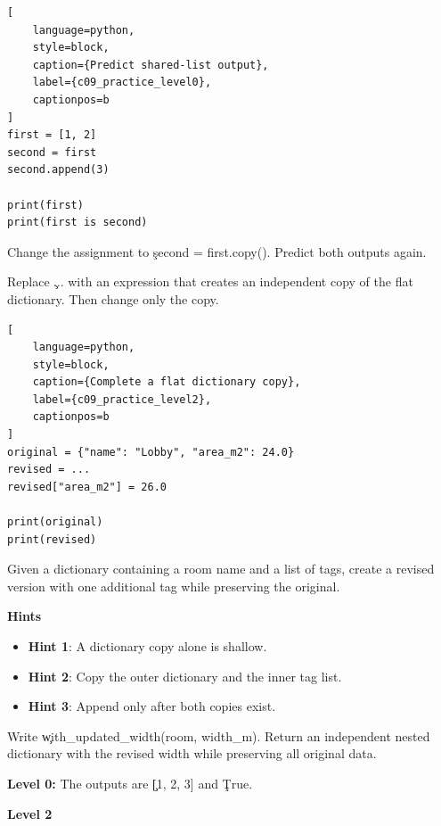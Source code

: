 

\begin{lstlisting}[
    language=python,
    style=block,
    caption={Predict shared-list output},
    label={c09_practice_level0},
    captionpos=b
]
first = [1, 2]
second = first
second.append(3)

print(first)
print(first is second)
\end{lstlisting}


Change the assignment to \c{second = first.copy()}. Predict both outputs again.


Replace \c{...} with an expression that creates an independent copy of the flat
dictionary. Then change only the copy.

\begin{lstlisting}[
    language=python,
    style=block,
    caption={Complete a flat dictionary copy},
    label={c09_practice_level2},
    captionpos=b
]
original = {"name": "Lobby", "area_m2": 24.0}
revised = ...
revised["area_m2"] = 26.0

print(original)
print(revised)
\end{lstlisting}


Given a dictionary containing a room name and a list of tags, create a revised
version with one additional tag while preserving the original.

\textbf{Hints}
\begin{itemize}
    \item \textbf{Hint 1}: A dictionary copy alone is shallow.
    \item \textbf{Hint 2}: Copy the outer dictionary and the inner tag list.
    \item \textbf{Hint 3}: Append only after both copies exist.
\end{itemize}


Write \c{with_updated_width(room, width_m)}. Return an independent nested
dictionary with the revised width while preserving all original data.


\textbf{Level 0:} The outputs are \c{[1, 2, 3]} and \c{True}.

\textbf{Level 2}


